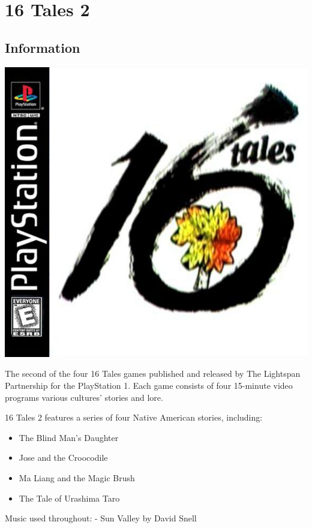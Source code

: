 \chapter{16 Tales 2}

\section{Information}

\includegraphics[width=\textwidth/2]{"./Games/16Tales/16TalesGeneralLogo.png"}

The second of the four 16 Tales games published and released by The Lightspan Partnership for the PlayStation 1. Each game consists of four 15-minute video programs various cultures' stories and lore.

16 Tales 2 features a series of four Native American stories, including:
\begin{itemize}
    \item The Blind Man's Daughter
    \item Jose and the Croocodile
    \item Ma Liang and the Magic Brush
    \item The Tale of Urashima Taro
\end{itemize}

Music used throughout:
- Sun Valley by David Snell


